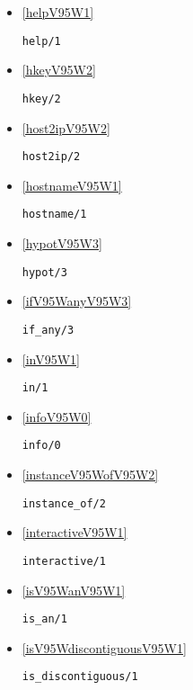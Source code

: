 \begin{itemize}
\item \ref{helpV95W1} 
\begin{verbatim}
help/1
\end{verbatim}

\item \ref{hkeyV95W2} 
\begin{verbatim}
hkey/2
\end{verbatim}

\item \ref{host2ipV95W2} 
\begin{verbatim}
host2ip/2
\end{verbatim}

\item \ref{hostnameV95W1} 
\begin{verbatim}
hostname/1
\end{verbatim}

\item \ref{hypotV95W3} 
\begin{verbatim}
hypot/3
\end{verbatim}

\item \ref{ifV95WanyV95W3} 
\begin{verbatim}
if_any/3
\end{verbatim}

\item \ref{inV95W1} 
\begin{verbatim}
in/1
\end{verbatim}

\item \ref{infoV95W0} 
\begin{verbatim}
info/0
\end{verbatim}

\item \ref{instanceV95WofV95W2} 
\begin{verbatim}
instance_of/2
\end{verbatim}

\item \ref{interactiveV95W1} 
\begin{verbatim}
interactive/1
\end{verbatim}

\item \ref{isV95WanV95W1} 
\begin{verbatim}
is_an/1
\end{verbatim}

\item \ref{isV95WdiscontiguousV95W1} 
\begin{verbatim}
is_discontiguous/1
\end{verbatim}


\end{itemize}
